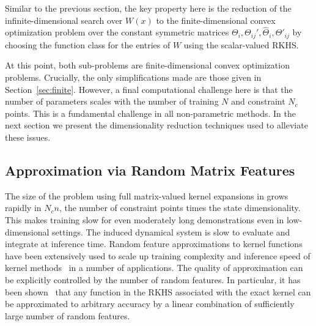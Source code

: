 Similar to the previous section, the key property here is the reduction of the infinite-dimensional search over $W(x)$ to the finite-dimensional convex optimization problem over the constant symmetric matrices $\Theta_i,\Theta_{ij}',\hat{\Theta}_i,\hat{\Theta}'_{ij}$ by choosing the function class for the entries of $W$ using the scalar-valued RKHS.

At this point, both sub-problems are finite-dimensional convex optimization problems. Crucially, the only simplifications made are those given in Section~\ref{sec:finite}. However, a final computational challenge here is that the number of parameters scales with the number of training $N$ and constraint $N_c$ points. This is a fundamental challenge in all non-parametric methods. In the next section we present the dimensionality reduction techniques used to alleviate these issues.

\subsection{Approximation via Random Matrix Features}
\label{sec:feat}

The size of the problem using full matrix-valued kernel expansions in grows rapidly in $N_c n$, the number of constraint points times the state dimensionality. This makes training slow for even moderately long demonstrations even in low-dimensional settings. The induced dynamical system is slow to evaluate and integrate at inference time. Random feature approximations to kernel functions have been extensively used to scale up training complexity and inference speed of kernel methods~\cite{RahimiRecht2007, HuangAvronEtAl2014} in a number of applications.  The quality of approximation can be explicitly controlled by the number of random features. In particular, it has been shown~\cite{RahimiRecht2008} that any function in the RKHS associated with the exact kernel can be approximated to arbitrary accuracy by a linear combination of sufficiently large number of random features. 


